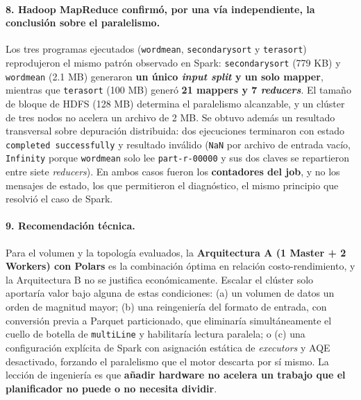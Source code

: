 \paragraph{8. Hadoop MapReduce confirmó, por una vía independiente, la conclusión sobre el paralelismo.} Los tres programas ejecutados (\texttt{wordmean}, \texttt{secondarysort} y \texttt{terasort}) reprodujeron el mismo patrón observado en Spark: \texttt{secondarysort} (779 KB) y \texttt{wordmean} (2.1 MB) generaron \textbf{un único \textit{input split} y un solo mapper}, mientras que \texttt{terasort} (100 MB) generó \textbf{21 mappers y 7 \textit{reducers}}. El tamaño de bloque de HDFS (128 MB) determina el paralelismo alcanzable, y un clúster de tres nodos no acelera un archivo de 2 MB. Se obtuvo además un resultado transversal sobre depuración distribuida: dos ejecuciones terminaron con estado \texttt{completed successfully} y resultado inválido (\texttt{NaN} por archivo de entrada vacío, \texttt{Infinity} porque \texttt{wordmean} solo lee \texttt{part-r-00000} y sus dos claves se repartieron entre siete \textit{reducers}). En ambos casos fueron los \textbf{contadores del job}, y no los mensajes de estado, los que permitieron el diagnóstico, el mismo principio que resolvió el caso de Spark.

\paragraph{9. Recomendación técnica.} Para el volumen y la topología evaluados, la \textbf{Arquitectura A (1 Master + 2 Workers) con Polars} es la combinación óptima en relación costo-rendimiento, y la Arquitectura B no se justifica económicamente. Escalar el clúster solo aportaría valor bajo alguna de estas condiciones: (a) un volumen de datos un orden de magnitud mayor; (b) una reingeniería del formato de entrada, con conversión previa a Parquet particionado, que eliminaría simultáneamente el cuello de botella de \texttt{multiLine} y habilitaría lectura paralela; o (c) una configuración explícita de Spark con asignación estática de \textit{executors} y AQE desactivado, forzando el paralelismo que el motor descarta por sí mismo. La lección de ingeniería es que \textbf{añadir hardware no acelera un trabajo que el planificador no puede o no necesita dividir}.
